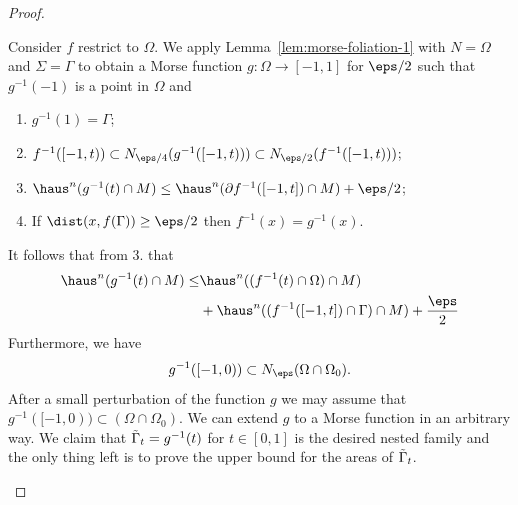 \begin{lemma}
\begin{proof}
\begin{itemize}
            Consider $f$ restrict to $\Omega$. We apply Lemma~\ref{lem:morse-foliation-1} with $N = \Omega$ and $\Sigma = \Gamma$ to obtain a Morse function $g: \Omega \to [-1, 1]$ for $\eps/2$ such that $g^{-1}(-1)$ is a point in $\Omega$ and 
            \begin{enumerate}
                \item $g^{-1}(1) = \Gamma$;
                \item $f^{-1}([-1, t)) \subset N_{\eps/4}(g^{-1}([-1, t))) \subset N_{\eps/2}(f^{-1}([-1, t)))$;
                \item $\haus^n(g^{-1}(t)\cap M) \leq \haus^n(\partial f^{-1}([-1, t])\cap M) + \eps/2$;
                \item If $\dist(x, f(\Gamma)) \geq \eps/2$ then $f^{-1}(x) = g^{-1}(x)$.
            \end{enumerate}
            It follows that from 3. that
            \begin{equation*}
                \begin{split}
                    \haus^n(g^{-1}(t)\cap M) \leq& \haus^n((f^{-1}(t)\cap \Omega)\cap M)\\
                    &+ \haus^n((f^{-1}([-1, t])\cap \Gamma)\cap M) + \frac{\eps}{2}
                \end{split}
            \end{equation*}
            Furthermore, we have
            \begin{equation*}
                g^{-1}([-1, 0)) \subset N_\eps(\Omega\cap \Omega_0).
            \end{equation*}
            After a small perturbation of the function $g$ we may assume that $g^{-1}([-1, 0)) \subset (\Omega\cap\Omega
            _0)$. We can extend $g$ to a Morse function in an arbitrary way. We claim that $\Tilde{\Gamma}_t = g^{-1}(t)$ for $t \in [0, 1]$ is the desired nested family and the only thing left is to prove the upper bound for the areas of $\Tilde{\Gamma}_t$.


\end{itemize}
\end{proof}
\end{lemma}
